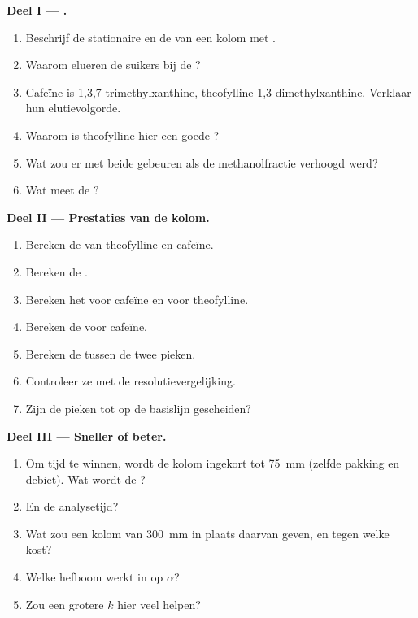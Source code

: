 \begin{problem}
\medskip
\noindent\textbf{Deel I --- .}
\begin{enumerate}
  \item Beschrijf de stationaire en de  van een kolom met .
  \item Waarom elueren de suikers bij de ?
  \item Cafeïne is 1,3,7-trimethylxanthine, theofylline 1,3-dimethylxanthine. Verklaar hun
        elutievolgorde.
  \item Waarom is theofylline hier een goede ?
  \item Wat zou er met beide  gebeuren als de methanolfractie verhoogd werd?
  \item Wat meet de ?
\end{enumerate}

\medskip
\noindent\textbf{Deel II --- Prestaties van de kolom.}
\begin{enumerate}[resume]
  \item Bereken de  van theofylline en cafeïne.
  \item Bereken de .
  \item Bereken het  voor cafeïne en voor theofylline.
  \item Bereken de  voor cafeïne.
  \item Bereken de  tussen de twee pieken.
  \item Controleer ze met de resolutievergelijking.
  \item Zijn de pieken tot op de basislijn gescheiden?
\end{enumerate}

\medskip
\noindent\textbf{Deel III --- Sneller of beter.}
\begin{enumerate}[resume]
  \item Om tijd te winnen, wordt de kolom ingekort tot \qty{75}{mm} (zelfde pakking en debiet). Wat wordt
        de ?
  \item En de analysetijd?
  \item Wat zou een kolom van \qty{300}{mm} in plaats daarvan geven, en tegen welke kost?
  \item Welke hefboom werkt in op $\alpha$?
  \item Zou een grotere $k$ hier veel helpen?
\end{enumerate}


\end{problem}
